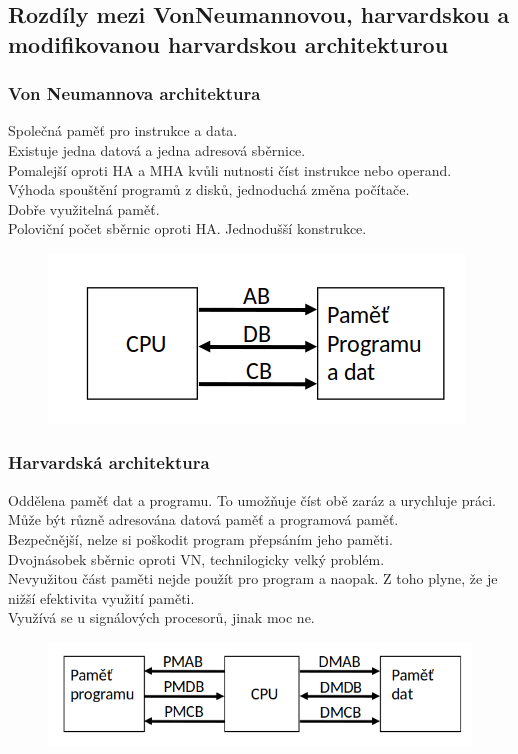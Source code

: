 \subsection{Rozdíly mezi VonNeumannovou, harvardskou a modifikovanou harvardskou architekturou}
\subsubsection*{Von Neumannova architektura}
Společná paměť pro instrukce a data. \\
Existuje jedna datová a jedna adresová sběrnice. \\
Pomalejší oproti HA a MHA kvůli nutnosti číst instrukce nebo operand. \\
Výhoda spouštění programů z disků, jednoduchá změna počítače. \\
Dobře využitelná paměť. \\
Poloviční počet sběrnic oproti HA. Jednodušší konstrukce. \\
\begin{figure}[h!]
    \centering
    \includegraphics[]{img/VNporovnani.png}
\end{figure}

\subsubsection{Harvardská architektura}
Oddělena paměť dat a programu. To umožňuje číst obě zaráz a urychluje práci.\\
Může být různě adresována datová paměť a programová paměť.\\
Bezpečnější, nelze si poškodit program přepsáním jeho paměti.\\
Dvojnásobek sběrnic oproti VN, technilogicky velký problém. \\
Nevyužitou část paměti nejde použít pro program a naopak. Z toho plyne, že je nižší efektivita využití paměti. \\
Využívá se u signálových procesorů, jinak moc ne.\\
\begin{figure}[h!]
    \centering
    \includegraphics[width = \textwidth]{img/HAporovnani.png}
\end{figure}


